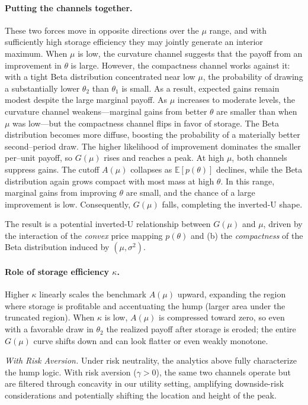 \paragraph{Putting the channels together.}
These two forces move in opposite directions over the $\mu$ range, and with sufficiently high storage efficiency they may jointly generate an interior maximum. When $\mu$ is low, the curvature channel suggests that the payoff from an improvement in $\theta$ is large. However, the compactness channel works against it: with a tight Beta distribution concentrated near low $\mu$, the probability of drawing a substantially lower $\theta_2$ than $\theta_1$ is small. As a result, expected gains remain modest despite the large marginal payoff. As $\mu$ increases to moderate levels, the curvature channel weakens---marginal gains from better $\theta$ are smaller than when $\mu$ was low---but the compactness channel flips in favor of storage. The Beta distribution becomes more diffuse, boosting the probability of a materially better second--period draw. The higher likelihood of improvement dominates the smaller per--unit payoff, so $G(\mu)$ rises and reaches a peak. At high $\mu$, both channels suppress gains. The cutoff $A(\mu)$ collapses as $\mathbb{E}[p(\theta)]$ declines, while the Beta distribution again grows compact with most mass at high $\theta$. In this range, marginal gains from improving $\theta$ are small, and the chance of a large improvement is low. Consequently, $G(\mu)$ falls, completing the inverted-U shape.

The result is a potential inverted-U relationship between $G(\mu)$ and $\mu$, driven by the interaction of the \emph{convex} price mapping $p(\theta)$ and (b) the \emph{compactness} of the Beta distribution induced by $(\mu,\sigma^2)$.


\paragraph{Role of storage efficiency $\kappa$.}
Higher $\kappa$ linearly scales the benchmark $A(\mu)$ upward, expanding the region where storage is profitable and accentuating the hump (larger area under the truncated region). When $\kappa$ is low, $A(\mu)$ is compressed toward zero, so even with a favorable draw in $\theta_2$ the realized payoff after storage is eroded; the entire $G(\mu)$ curve shifts down and can look flatter or even weakly monotone.

\medskip
\noindent\textit{With Risk Aversion.} Under risk neutrality, the analytics above fully characterize the hump logic. With risk aversion ($\gamma>0$), the same two channels operate but are filtered through concavity in our utility setting, amplifying downside-risk considerations and potentially shifting the location and height of the peak.

